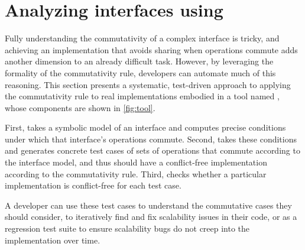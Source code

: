 \section{Analyzing interfaces using \tool}
\label{sec:tool}

Fully understanding the commutativity of a complex interface is
tricky, and achieving an
implementation that avoids sharing when operations commute adds another
dimension to an already difficult task.  However, by leveraging the
formality of the commutativity rule, developers can automate much of this
reasoning.  This section presents a systematic, test-driven approach to
applying the commutativity rule to real implementations embodied in a
tool named \tool, whose components are shown in
\cref{fig:tool}.


\begin{figure*}

\caption{The components of \tool.}
\label{fig:tool}
\end{figure*}

First, \analyzer takes a symbolic model of
an interface and computes precise conditions under which that interface's
operations commute.  Second, \testgen takes
these conditions and generates concrete test cases of sets of operations
that commute according to the interface model, and thus should
have a conflict-free implementation according to the commutativity rule.
%
Third, \mtrace checks whether a particular implementation is
conflict-free for each test case.

A developer can use these test cases to understand the
commutative cases they should consider,
to iteratively find and fix scalability
issues in their
code, or as a regression test suite to ensure
scalability bugs do not creep into the implementation over time.


\subsection{\analyzer}
\label{sec:tool:analyzer}



